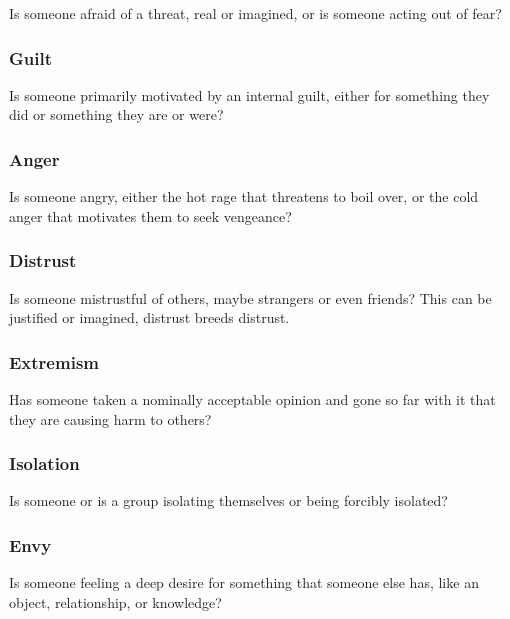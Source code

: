 \documentclass[
]{article}
\begin{document}
Is someone afraid of a threat, real or imagined, or is someone acting
out of fear?

\hypertarget{guilt}{%
\subsubsection{Guilt}\label{guilt}}

Is someone primarily motivated by an internal guilt, either for
something they did or something they are or were?

\hypertarget{anger}{%
\subsubsection{Anger}\label{anger}}

Is someone angry, either the hot rage that threatens to boil over, or
the cold anger that motivates them to seek vengeance?

\hypertarget{distrust}{%
\subsubsection{Distrust}\label{distrust}}

Is someone mistrustful of others, maybe strangers or even friends? This
can be justified or imagined, distrust breeds distrust.

\hypertarget{extremism}{%
\subsubsection{Extremism}\label{extremism}}

Has someone taken a nominally acceptable opinion and gone so far with it
that they are causing harm to others?

\hypertarget{isolation}{%
\subsubsection{Isolation}\label{isolation}}

Is someone or is a group isolating themselves or being forcibly
isolated?

\hypertarget{envy}{%
\subsubsection{Envy}\label{envy}}

Is someone feeling a deep desire for something that someone else has,
like an object, relationship, or knowledge?
\end{document}
